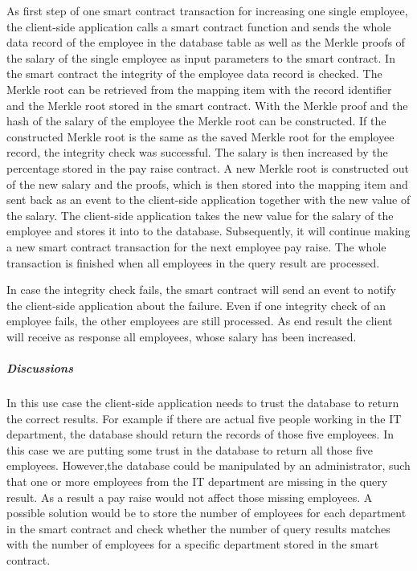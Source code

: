 As first step of one smart contract transaction for increasing one single employee, the client-side application calls a smart contract function and sends the whole data record of the employee in the database table as well as the Merkle proofs of the salary of the single employee as input parameters to the smart contract. In the smart contract the integrity of the employee data record is checked. The Merkle root can be retrieved from the mapping item with the record identifier and the Merkle root stored in the smart contract. With the Merkle proof and the hash of the salary of the employee the Merkle root can be constructed. If the constructed Merkle root is the same as the saved Merkle root for the employee record, the integrity check was successful. The salary is then increased by the percentage stored in the pay raise contract. A new Merkle root is constructed out of the new salary and the proofs, which is then stored into the mapping item and sent back as an event to the client-side application together with the new value of the salary. The client-side application takes the new value for the salary of the employee and stores it into to the database. Subsequently, it will continue making a new smart contract transaction for the next employee pay raise. The whole transaction is finished when all employees in the query result are processed.

In case the integrity check fails, the smart contract will send an event to notify the client-side application about the failure. Even if one integrity check of an employee fails, the other employees are still processed. As end result the client will receive as response all employees, whose salary has been increased.

\subparagraph{Discussions}

In this use case the client-side application needs to trust the database to return the correct results. For example if there are actual five people working in the IT department, the database should return the records of those five employees. In this case we are putting some trust in the database to return all those five employees. However,the database could be manipulated by an administrator, such that one or more employees from the IT department are missing in the query result. As a result a pay raise would not affect those missing employees. A possible solution would be to store the number of employees for each department in the smart contract and check whether the number of query results matches with the number of employees for a specific department stored in the smart contract.
